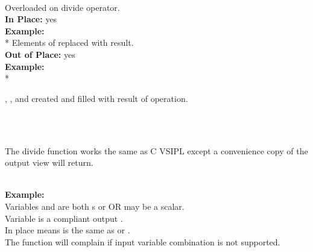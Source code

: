 \pyjvsiph
\\\vmthdh
\hspace*{.06\textwidth}Overloaded on divide operator.\\
\hspace*{.06\textwidth}\textbf{In Place: }\hspace{.2cm} yes\\
\hspace*{.08\textwidth}\textbf{Example: }\\*
\hspace*{.1\textwidth}Elements of  replaced with result.\\
\hspace*{.06\textwidth}\textbf{Out of Place: }\hspace{.2cm} yes\\
\hspace*{.08\textwidth}\textbf{Example: }\\*
\hspace*{.1\textwidth}\parbox{.85\textwidth}{, , and   created and filled with result of operation.}\\
\\
\hspace*{.06\textwidth}\parbox{.93\textwidth}{The divide function works the same as C VSIPL except a convenience copy of the output view will return.\vspace{.2cm}}\\
\hspace*{.08\textwidth}\textbf{Example: }\\
\hspace*{.1\textwidth}Variables  and  are both s or  OR  may be a scalar.\\
\hspace*{.1\textwidth}Variable  is a compliant output .\\
\hspace*{.1\textwidth}In place means  is the same as  or .\\
\hspace*{.1\textwidth}The function will complain if input variable combination is not supported.\\

